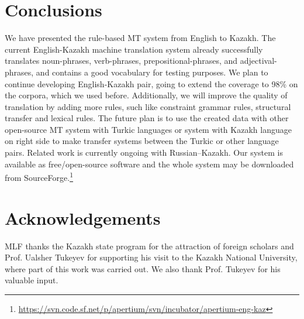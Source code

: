 \documentclass[11pt]{article}
\begin{document}
\section{Conclusions}

We have presented the rule-based MT system from English to Kazakh. The current English-Kazakh machine translation 
system already successfully translates noun-phrases, verb-phrases, prepositional-phrases, and adjectival-phrases, and 
contains a good vocabulary for testing purposes. 
We plan to continue developing English-Kazakh pair, going to extend the coverage to 98\% on the corpora, 
which we used before. Additionally, we will improve the quality of translation by adding more rules, such like 
constraint grammar rules, structural transfer and lexical rules. The future plan is to use the created data with other 
open-source MT system with Turkic languages or system with Kazakh language on right side to make transfer systems 
between the Turkic or other language pairs. Related work is currently ongoing with Russian--Kazakh. 
Our system is available as free/open-source software and the whole system may be downloaded 
from SourceForge.\footnote{\url{https://svn.code.sf.net/p/apertium/svn/incubator/apertium-eng-kaz}}

\section*{Acknowledgements}

MLF thanks the Kazakh state program for the attraction of foreign scholars and Prof. Ualsher Tukeyev for supporting his visit to the Kazakh National University, where part of this work was carried out. We also thank Prof. Tukeyev for his valuable input.




\end{document}
